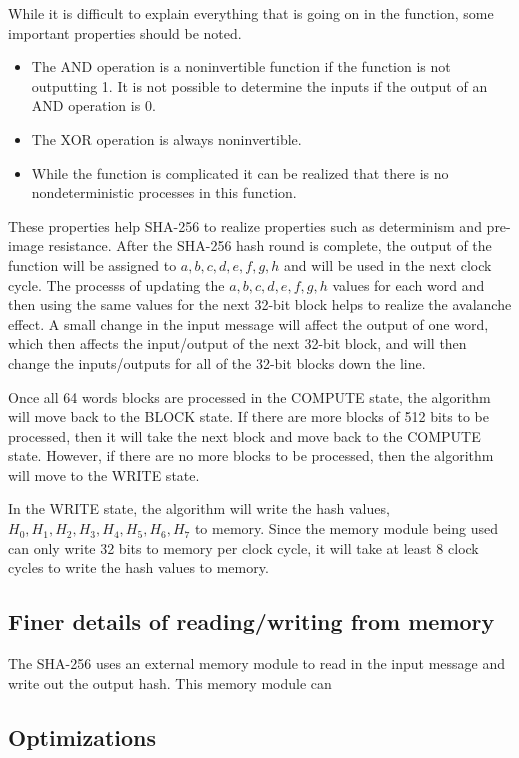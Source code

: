 \documentclass{article}
\begin{document}
While it is difficult to explain everything that is going on in the function, some important properties should be noted.
\begin{itemize}
  \item The AND operation is a noninvertible function if the function is not outputting 1. It is not possible to determine the inputs if the output of an AND operation is 0.
  \item The XOR operation is always noninvertible.
  \item While the function is complicated it can be realized that there is no nondeterministic processes in this function.
\end{itemize}
These properties help SHA-256 to realize properties such as determinism and pre-image resistance. After the SHA-256 hash round is complete, the output of the function will be assigned to $a,b,c,d,e,f,g,h$ and will be used in the next clock cycle. The processs of updating the $a,b,c,d,e,f,g,h$ values for each word and then using the same values for the next 32-bit block helps to realize the avalanche effect. A small change in the input message will affect the output of one word, which then affects the input/output of the next 32-bit block, and will then change the inputs/outputs for all of the 32-bit blocks down the line.

Once all 64 words blocks are processed in the COMPUTE state, the algorithm will move back to the BLOCK state. If there are more blocks of 512 bits to be processed, then it will take the next block and move back to the COMPUTE state. However, if there are no more blocks to be processed, then the algorithm will move to the WRITE state.

In the WRITE state, the algorithm will write the hash values, $H_0, H_1, H_2, H_3, H_4, H_5, H_6, H_7$ to memory. Since the memory module being used can only write 32 bits to memory per clock cycle, it will take at least 8 clock cycles to write the hash values to memory.

\subsection{Finer details of reading/writing from memory}

The SHA-256 uses an external memory module to read in the input message and write out the output hash. This memory module can

\subsection{Optimizations}
\end{document}
